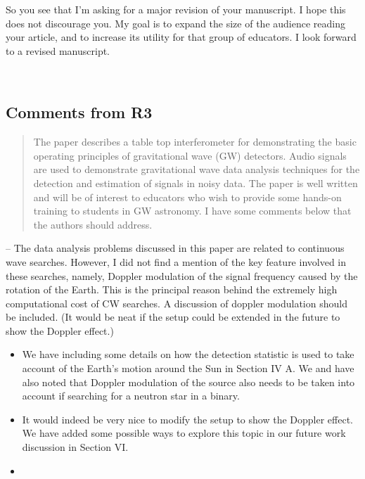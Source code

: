 \documentclass{article}
\begin{document}
\noindent So you see that I'm asking for a major revision of your manuscript.  I hope this does not discourage you.  My goal is to expand the size of the audience reading your article, and to increase its utility for that group of educators.  I look forward to a revised manuscript.

\hspace{1em}\vspace{2em}\\

\subsection*{Comments from R3}

\begin{quote}
The paper describes a table top interferometer for demonstrating the basic operating principles of gravitational wave (GW) detectors. Audio signals are used to demonstrate gravitational wave data analysis techniques for the detection and estimation of signals in noisy data. The paper is well written and will be of interest to educators who wish to provide some hands-on training to students in GW astronomy. I have some comments below that the authors should address.
\end{quote}

\noindent 
-- The data analysis problems discussed in this paper are related to continuous wave searches. However, I did not find a mention of the key feature involved in these searches, namely, Doppler modulation of the signal frequency caused by the rotation of the Earth. This is the principal reason behind the extremely high computational cost of CW searches. A discussion of doppler modulation should be included. (It would be neat if the setup could be extended in the future to show the Doppler effect.)
\begin{itemize}
\item We have including some details on how the detection statistic is used to take account of the Earth's motion around the Sun in Section IV A. We and have also noted that Doppler modulation of the source also needs to be taken into account if searching for a neutron star in a binary. 
\item It would indeed be very nice to modify the setup to show the Doppler effect. We have added some possible ways to explore this topic in our future work discussion in Section VI. 
\item[]
\end{itemize}
\end{document}
